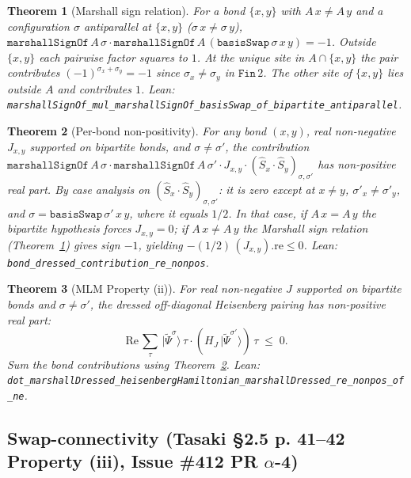 \documentclass[a4paper,11pt]{article}
\newtheorem{theorem}{Theorem}
\begin{document}
\begin{theorem}[Marshall sign relation]
\label{thm:marshall-swap-sign}
For a bond $\{x, y\}$ with $A\,x \neq A\,y$ and a configuration
$\sigma$ antiparallel at $\{x, y\}$ ($\sigma\,x \neq \sigma\,y$),
$\texttt{marshallSignOf}\,A\,\sigma \cdot
 \texttt{marshallSignOf}\,A\,(\texttt{basisSwap}\,\sigma\,x\,y) = -1$.
Outside $\{x, y\}$ each pairwise factor squares to $1$. At the
unique site in $A \cap \{x, y\}$ the pair contributes
$(-1)^{\sigma_x + \sigma_y} = -1$ since $\sigma_x \neq \sigma_y$
in $\texttt{Fin}\,2$. The other site of $\{x, y\}$ lies outside
$A$ and contributes $1$. Lean:
\texttt{marshallSignOf\_mul\_marshallSignOf\_basisSwap\_of\_bipartite\_antiparallel}.
\end{theorem}

\begin{theorem}[Per-bond non-positivity]
\label{thm:bond-dressed-nonpos}
For any bond $(x, y)$, real non-negative $J_{x,y}$ supported on
bipartite bonds, and $\sigma \neq \sigma'$, the contribution
$\texttt{marshallSignOf}\,A\,\sigma \cdot
 \texttt{marshallSignOf}\,A\,\sigma' \cdot J_{x,y} \cdot
 (\hat S_x \cdot \hat S_y)_{\sigma,\sigma'}$
has non-positive real part. By case analysis on
$(\hat S_x \cdot \hat S_y)_{\sigma,\sigma'}$: it is zero except
at $x \neq y$, $\sigma'_x \neq \sigma'_y$, and
$\sigma = \texttt{basisSwap}\,\sigma'\,x\,y$, where it equals
$1/2$. In that case, if $A\,x = A\,y$ the bipartite hypothesis
forces $J_{x,y} = 0$; if $A\,x \neq A\,y$ the Marshall sign
relation (Theorem~\ref{thm:marshall-swap-sign}) gives sign $-1$,
yielding $-(1/2)\,(J_{x,y}).\mathrm{re} \le 0$. Lean:
\texttt{bond\_dressed\_contribution\_re\_nonpos}.
\end{theorem}

\begin{theorem}[MLM Property (ii)]
\label{thm:dressed-offdiagonal-nonpos}
For real non-negative $J$ supported on bipartite bonds and
$\sigma \neq \sigma'$, the dressed off-diagonal Heisenberg
pairing has non-positive real part:
\[
  \mathrm{Re}\,\sum_\tau\,
    |\widetilde{\Psi}^\sigma\rangle\,\tau \cdot
    (H_J\,|\widetilde{\Psi}^{\sigma'}\rangle)\,\tau \;\le\; 0.
\]
Sum the bond contributions using
Theorem~\ref{thm:bond-dressed-nonpos}. Lean:
\texttt{dot\_marshallDressed\_heisenbergHamiltonian\_marshallDressed\_re\_nonpos\_of\_ne}.
\end{theorem}

\subsection{Swap-connectivity (Tasaki §2.5 p. 41--42 Property (iii),
Issue \#412 PR $\alpha$-4)}
\label{ssec:mlm-connectivity}
\end{document}
